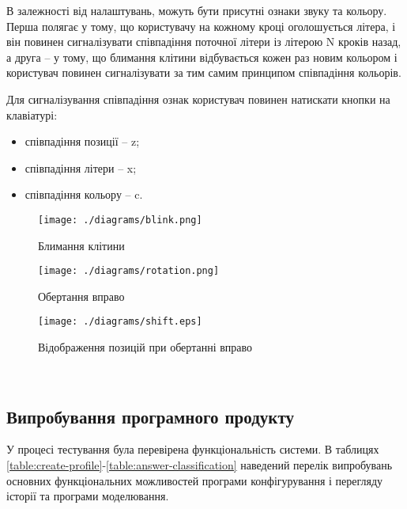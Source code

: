 В залежності від налаштувань, можуть бути присутні ознаки звуку та кольору. Перша полягає у тому, що користувачу на кожному кроці оголошується літера, і він повинен сигналізувати співпадіння поточної літери із літерою N кроків назад, а друга -- у тому, що блимання клітини відбувається кожен раз новим кольором і користувач повинен сигналізувати за тим самим принципом співпадіння кольорів.

Для сигналізування співпадіння ознак користувач повинен натискати кнопки на клавіатурі:
\begin{itemize}
  \item співпадіння позиції -- z;
  \item співпадіння літери -- x;
  \item співпадіння кольору -- c.
\end{itemize}

\begin{figure}[here]
  \centering\texttt{[image: ./diagrams/blink.png]}
  \caption{Блимання клітини}
  \label{fig:blink}
\end{figure}

\begin{figure}[here]
  \centering\texttt{[image: ./diagrams/rotation.png]}
  \caption{Обертання вправо}
  \label{fig:rotation}
\end{figure}

\begin{figure}[here]
  \centering\texttt{[image: ./diagrams/shift.eps]}
  \caption{Відображення позицій при обертанні вправо}
  \label{fig:shift}
\end{figure}

\newpage
~\newpage
\subsection{Випробування програмного продукту}

У процесі тестування була перевірена функціональність системи. В таблицях \ref{table:create-profile}-\ref{table:answer-classification} наведений перелік випробувань основних функціональних можливостей програми конфігурування і перегляду історії та програми моделювання.

